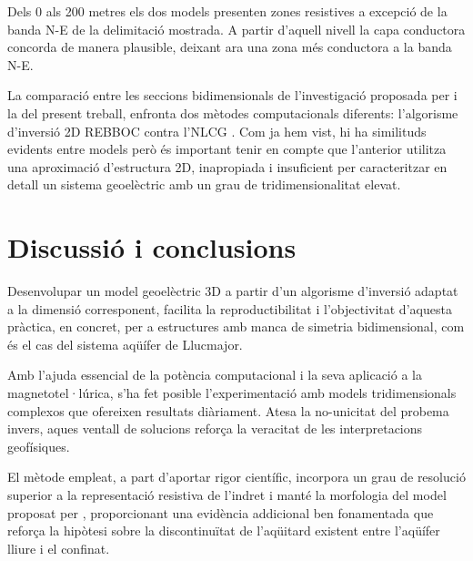 \documentclass[11pt,a4paper,oneside]{article}
\begin{document}
Dels 0 als 200 metres els dos models presenten zones resistives a excepció de la banda N-E de la delimitació mostrada. A partir d'aquell nivell la capa conductora concorda de manera plausible, deixant ara una zona més conductora a la banda N-E.

\vspace{5pt}

La comparació entre les seccions bidimensionals de l'investigació proposada per \citet{arango2005} i la del present treball, enfronta dos mètodes computacionals diferents: l'algorisme d'inversió 2D REBBOC \citep{siripunvaraporn2000} contra l'NLCG \citep{rodi2001}. Com ja hem vist, hi ha similituds evidents entre models però és important tenir en compte que l'anterior utilitza una aproximació d'estructura 2D, inapropiada i insuficient per caracteritzar en detall un sistema geoelèctric amb un grau de tridimensionalitat elevat.  


\section{Discussió i conclusions}

Desenvolupar un model geoelèctric 3D a partir d'un algorisme d'inversió adaptat a la dimensió corresponent, facilita la reproductibilitat i l'objectivitat d'aquesta pràctica, en concret, per a estructures amb manca de simetria bidimensional, com és el cas del sistema aqüífer de Llucmajor.

\vspace{5pt}


Amb l'ajuda essencial de la potència computacional i la seva aplicació a la magnetotel·lúrica, s'ha fet posible l'experimentació amb models tridimensionals complexos que ofereixen resultats diàriament. Atesa la no-unicitat del probema invers, aques ventall de solucions reforça la veracitat de les interpretacions geofísiques.

\vspace{5pt}

El mètode empleat, a part d'aportar rigor científic, incorpora un grau de resolució superior a la representació resistiva de l'indret i manté la morfologia del model proposat per \citet{arango2005}, proporcionant una evidència addicional ben fonamentada que reforça la hipòtesi sobre la discontinuïtat de l'aqüitard existent entre l'aqüífer lliure i el confinat. 



\clearpage
\end{document}
